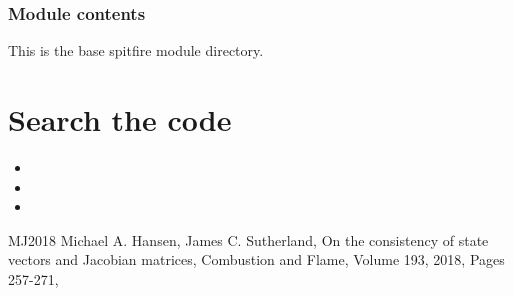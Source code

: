\documentclass[letterpaper,10pt,english]{sphinxmanual}
\begin{document}
\subsection{Module contents}
\label{\detokenize{spitfire:module-spitfire}}\label{\detokenize{spitfire:module-contents}}
This is the base spitfire module directory.


\chapter{Search the code}
\label{\detokenize{index:search-the-code}}\begin{itemize}
\item {} 

\item {} 

\item {} 

\end{itemize}

\begin{sphinxthebibliography}{MJ2018}
Michael A. Hansen, James C. Sutherland,
On the consistency of state vectors and Jacobian matrices,
Combustion and Flame,
Volume 193,
2018,
Pages 257-271,
\end{sphinxthebibliography}
\end{document}
